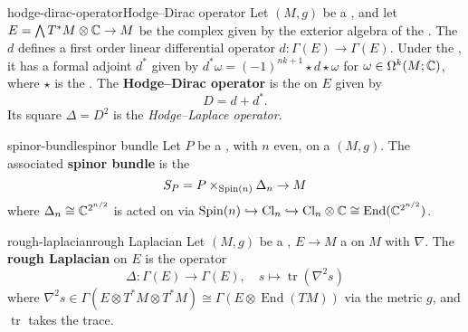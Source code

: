 \begin{topic}{hodge-dirac-operator}{Hodge--Dirac operator}
    Let $(M, g)$ be a , and let $E = \bigwedge T^*M \otimes \mathbb{C} \to M$ be the complex  given by the exterior algebra of the . The  $d$ defines a first order linear differential operator $d \colon \Gamma(E) \to \Gamma(E)$. Under the , it has a formal adjoint $d^*$ given by $d^* \omega = (-1)^{nk + 1} \star d \star \omega$ for $\omega \in \Omega^k(M; \mathbb{C})$, where $\star$ is the . The \textbf{Hodge--Dirac operator} is the  on $E$ given by
    \[ D = d + d^* . \]
    Its square $\Delta = D^2$ is the \textit{Hodge--Laplace operator}.
\end{topic}

\begin{topic}{spinor-bundle}{spinor bundle}
    Let $P$ be a , with $n$ even, on a  $(M, g)$. The associated \textbf{spinor bundle} is the 
    \[ S_P = P \times_{\textup{Spin}(n)} \Delta_n \to M \]
    where $\Delta_n \cong \mathbb{C}^{2^{n/2}}$ is acted on via $\textup{Spin}(n) \hookrightarrow \textup{Cl}_n \hookrightarrow \textup{Cl}_n \otimes \mathbb{C} \cong \operatorname{End}(\mathbb{C}^{2^{n/2}})$.
\end{topic}

\begin{topic}{rough-laplacian}{rough Laplacian}
    Let $(M, g)$ be a , $E \to M$ a  on $M$ with  $\nabla$. The \textbf{rough Laplacian} on $E$ is the operator
    \[ \Delta \colon \Gamma(E) \to \Gamma(E), \quad s \mapsto \operatorname{tr}(\nabla^2 s) \]
    where $\nabla^2 s \in \Gamma(E \otimes T^*M \otimes T^*M) \cong \Gamma(E \otimes \operatorname{End}(TM))$ via the metric $g$, and $\operatorname{tr}$ takes the trace.
\end{topic}

